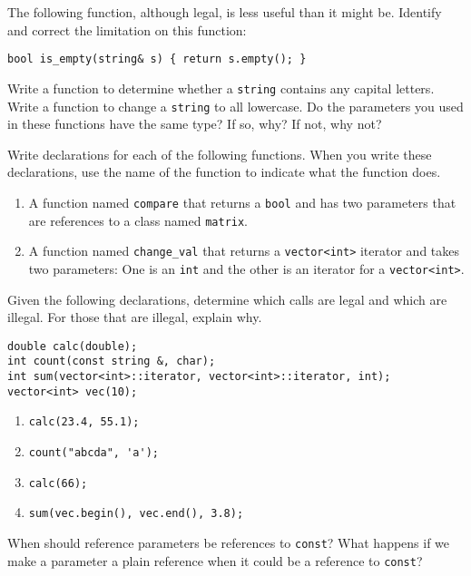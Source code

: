 %
%
\begin{question}
The following function, although legal, is less useful than it
might be. Identify and correct the limitation on this function:
\begin{lstlisting}
bool is_empty(string& s) { return s.empty(); }
\end{lstlisting}
\end{question}

\begin{question}
Write a function to determine whether a \verb|string| contains
any capital letters. Write a function to change a \verb|string| to all lowercase. Do
the parameters you used in these functions have the same type? If so, why?
If not, why not?
\end{question}

\begin{question}
Write declarations for each of the following functions. When
you write these declarations, use the name of the function to indicate what
the function does.
\begin{enumerate}[label=(\alph*)]
^^I\item A function named \verb|compare| that returns a \verb|bool| and has two parameters
that are references to a class named \verb|matrix|.
^^I\item A function named \verb|change_val| that returns a \verb|vector<int>| iterator
and takes two parameters: One is an \verb|int| and the other is an iterator for a
\verb|vector<int>|.
\end{enumerate}
\end{question}

\begin{question}
Given the following declarations, determine which calls are
legal and which are illegal. For those that are illegal, explain why.
\begin{lstlisting}
double calc(double);
int count(const string &, char);
int sum(vector<int>::iterator, vector<int>::iterator, int);
vector<int> vec(10);
\end{lstlisting}

\begin{enumerate}[label=(\alph*)]
^^I\item \verb|calc(23.4, 55.1);|
^^I\item \verb|count("abcda", 'a');|
^^I\item \verb|calc(66);|
^^I\item \verb|sum(vec.begin(), vec.end(), 3.8);|
\end{enumerate}
\end{question}

\begin{question}
When should reference parameters be references to \verb|const|?
What happens if we make a parameter a plain reference when it could be a
reference to \verb|const|?
\end{question}
